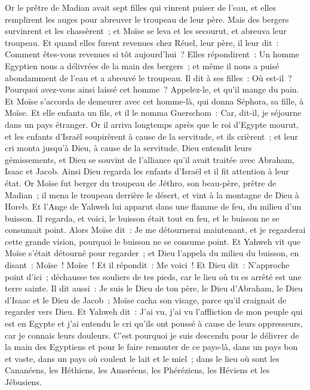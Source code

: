 \begin{multicols}{2}
Or le prêtre de Madian avait sept filles qui vinrent puiser de l'eau, et elles remplirent les auges pour abreuver le troupeau de leur père.
Mais des bergers survinrent et les chassèrent~; et Moïse se leva et les secourut, et abreuva leur troupeau.
Et quand elles furent revenues chez Réuel, leur père, il leur dit~: Comment êtes-vous revenues si tôt aujourd'hui~?
Elles répondirent~: Un homme Egyptien nous a délivrées de la main des bergers~; et même il nous a puisé abondamment de l'eau et a abreuvé le troupeau.
Il dit à ses filles~: Où est-il~? Pourquoi avez-vous ainsi laissé cet homme~? Appelez-le, et qu'il mange du pain.
Et Moïse s'accorda de demeurer avec cet homme-là, qui donna Séphora, sa fille, à Moïse.
Et elle enfanta un fils, et il le nomma Guerschom~: Car, dit-il, je séjourne dans un pays étranger.
Or il arriva longtemps après que le roi d'Egypte mourut, et les enfants d'Israël soupirèrent à cause de la servitude, et ils crièrent~; et leur cri monta jusqu'à Dieu, à cause de la servitude.
Dieu entendit leurs gémissements, et Dieu se souvint de l'alliance qu'il avait traitée avec Abraham, Isaac et Jacob.
Ainsi Dieu regarda les enfants d'Israël et il fit attention à leur état.
\VerseOne{}Or Moïse fut berger du troupeau de Jéthro, son beau-père, prêtre de Madian~; il mena le troupeau derrière le désert, et vint à la montagne de Dieu à Horeb.
Et l'Ange de Yahweh lui apparut dans une flamme de feu, du milieu d'un buisson. Il regarda, et voici, le buisson était tout en feu, et le buisson ne se consumait point.
Alors Moïse dit~: Je me détournerai maintenant, et je regarderai cette grande vision, pourquoi le buisson ne se consume point.
Et Yahweh vit que Moïse s'était détourné pour regarder~; et Dieu l'appela du milieu du buisson, en disant~: Moïse~! Moïse~! Et il répondit~: Me voici~!
Et Dieu dit~: N'approche point d'ici~; déchausse tes souliers de tes pieds, car le lieu où tu es arrêté est une terre sainte.
Il dit aussi~: Je suis le Dieu de ton père, le Dieu d'Abraham, le Dieu d'Isaac et le Dieu de Jacob~; Moïse cacha son visage, parce qu'il craignait de regarder vers Dieu.
 Et Yahweh dit~: J'ai vu, j'ai vu l'affliction de mon peuple qui est en Egypte et j'ai entendu le cri qu'ils ont poussé à cause de leurs oppresseurs, car je connais leurs douleurs.
C'est pourquoi je suis descendu pour le délivrer de la main des Egyptiens et pour le faire remonter de ce pays-là, dans un pays bon et vaste, dans un pays où coulent le lait et le miel~; dans le lieu où sont les Cananéens, les Héthiens, les Amoréens, les Phéréziens, les Héviens et les Jébusiens.

\end{multicols}

